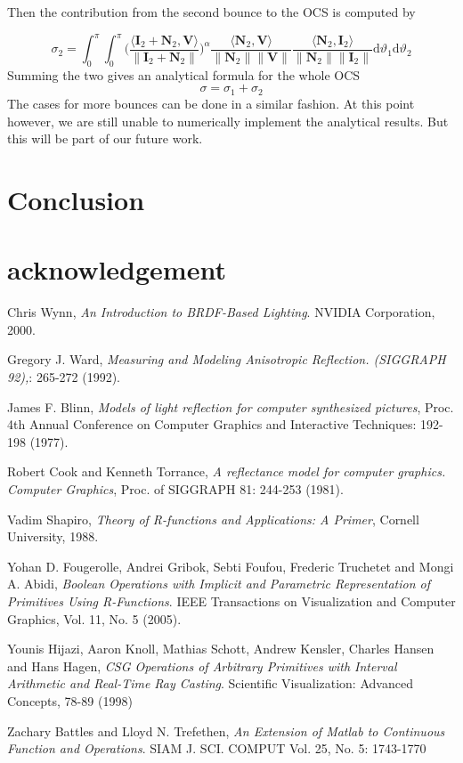 \documentclass[11pt]{amsart}
\newcommand{\ip}[2]{\langle {#1}, {#2} \rangle}
\theoremstyle{definition}
\begin{document}
Then the contribution from the second bounce to the OCS is computed by

$$\sigma_2 =\int_{0}^{\pi}\int_{0}^{\pi}\Bigg(\frac{\ip{\mathbf{I}_2+\mathbf{N}_2}{\mathbf{V}}}{\|\mathbf{I}_2+\mathbf{N}_2\|}\Bigg)^\alpha\frac{\ip{\mathbf{N}_2}{\mathbf{V}}}{\|\mathbf{N}_2\| \|\mathbf{V}\|}\frac{\ip{\mathbf{N}_2}{\mathbf{I}_2}}{\|\mathbf{N}_2\| \|\mathbf{I}_2\|}\mathrm{d}\vartheta_1\mathrm{d}\vartheta_2$$
Summing the two gives an analytical formula for the whole OCS
 $$ \sigma= \sigma_1+\sigma_2$$
The cases for more bounces can be done in a similar fashion. At this point however, we are still unable to numerically implement the analytical results. But this will be part of our future work.
\section{Conclusion}
\section{acknowledgement}

\begin{thebibliography}{9}
Chris Wynn,
\emph{An Introduction to BRDF-Based Lighting}.
NVIDIA Corporation, 2000.

Gregory J. Ward, 
\emph{Measuring and Modeling Anisotropic Reflection. (SIGGRAPH 92),}: 265-272 (1992).

James F. Blinn,  
\emph{Models of light reflection for computer synthesized pictures}, Proc. 4th
Annual Conference on Computer Graphics and Interactive Techniques: 192-198
(1977). 

Robert Cook and Kenneth Torrance,
\emph{A reflectance model for computer graphics. Computer Graphics}, Proc. of SIGGRAPH 81: 244-253 (1981).  

Vadim Shapiro,
\emph{Theory of R-functions and Applications: A Primer}, Cornell University, 1988.

Yohan D. Fougerolle, Andrei Gribok, Sebti Foufou, Frederic Truchetet and Mongi A. Abidi,
\emph{Boolean Operations with Implicit and Parametric Representation of Primitives Using R-Functions}.
IEEE Transactions on Visualization and Computer Graphics, Vol. 11, No. 5 (2005).

Younis Hijazi, Aaron Knoll, Mathias Schott, Andrew Kensler, Charles Hansen and Hans Hagen,
\emph{CSG Operations of Arbitrary Primitives with Interval Arithmetic and Real-Time Ray Casting}.
Scientific Visualization: Advanced Concepts, 78-89 (1998) 
	
 
  Zachary Battles and Lloyd N. Trefethen,
  \emph{An Extension of Matlab to Continuous Function and Operations}.
  SIAM J. SCI. COMPUT Vol. 25, No. 5: 1743-1770 
 



	



\end{thebibliography}


%
\end{document}
